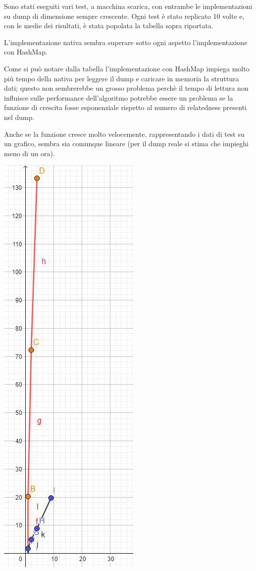 Sono stati eseguiti vari test, a macchina scarica, con entrambe le implementazioni su dump di dimensione sempre crescente. 
Ogni test è stato replicato 10 volte e, con le medie dei risultati, è stata popolata la tabella sopra riportata.

L'implementazione nativa sembra superare sotto ogni aspetto l'implementazione con HashMap.

Come si può notare dalla tabella l'implementazione con HashMap impiega molto più tempo della nativa per leggere il dump e caricare in memoria la struttura dati;
questo non sembrerebbe un grosso problema perchè il tempo di lettura non influisce sulle performance dell'algoritmo potrebbe essere un problema se la funzione di crescita 
fosse esponenziale rispetto al numero di relatedness presenti nel dump. 

Anche se la funzione cresce molto velocemente, rappresentando i dati di test su un grafico, sembra sia comunque lineare (per il dump reale si stima che impieghi meno di un ora).

\begin{center}
    \includegraphics[scale=0.55]{Sources/Img/c03_02.jpg}
\end{center}

